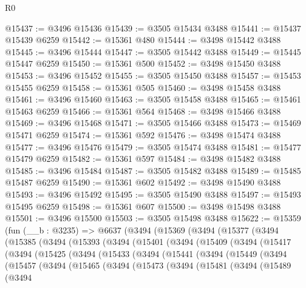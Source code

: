 \begin{lexlean}{R0}
\begin{coremodule}
@15437 := @3496 @15436
@15439 := @3505 @15434 @3488
@15441 := @15437 @15439 @6259
@15442 := @15361 @480
@15444 := @3498 @15442 @3488
@15445 := @3496 @15444
@15447 := @3505 @15442 @3488
@15449 := @15445 @15447 @6259
@15450 := @15361 @500
@15452 := @3498 @15450 @3488
@15453 := @3496 @15452
@15455 := @3505 @15450 @3488
@15457 := @15453 @15455 @6259
@15458 := @15361 @505
@15460 := @3498 @15458 @3488
@15461 := @3496 @15460
@15463 := @3505 @15458 @3488
@15465 := @15461 @15463 @6259
@15466 := @15361 @564
@15468 := @3498 @15466 @3488
@15469 := @3496 @15468
@15471 := @3505 @15466 @3488
@15473 := @15469 @15471 @6259
@15474 := @15361 @592
@15476 := @3498 @15474 @3488
@15477 := @3496 @15476
@15479 := @3505 @15474 @3488
@15481 := @15477 @15479 @6259
@15482 := @15361 @597
@15484 := @3498 @15482 @3488
@15485 := @3496 @15484
@15487 := @3505 @15482 @3488
@15489 := @15485 @15487 @6259
@15490 := @15361 @602
@15492 := @3498 @15490 @3488
@15493 := @3496 @15492
@15495 := @3505 @15490 @3488
@15497 := @15493 @15495 @6259
@15498 := @15361 @607
@15500 := @3498 @15498 @3488
@15501 := @3496 @15500
@15503 := @3505 @15498 @3488
@15622 := @15359
    (fun (__b : @3235) =>
    @6637
      (@3494
        (@15369
          (@3494
            (@15377
              (@3494
                (@15385
                  (@3494
                    (@15393
                      (@3494
                        (@15401
                          (@3494
                            (@15409
                              (@3494
                                (@15417
                                  (@3494
                                    (@15425
                                      (@3494
                                        (@15433
                                          (@3494
                                            (@15441
                                              (@3494
                                                (@15449
                                                  (@3494
                                                    (@15457
                                                      (@3494
                                                        (@15465
                                                          (@3494
                                                            (@15473
                                                              (@3494
                                                                (@15481
                                                                  (@3494
                                                                    (@15489
                                                                      (@3494

\end{coremodule}
\end{lexlean}

